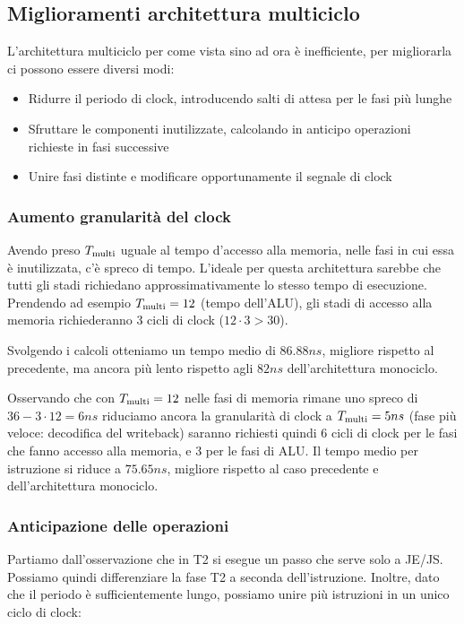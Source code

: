\documentclass[../ace.tex]{subfiles}
\begin{document}
\subsection{Miglioramenti architettura multiciclo}
L'architettura multiciclo per come vista sino ad ora è inefficiente, per migliorarla ci possono essere diversi modi:
\begin{itemize}
    \item Ridurre il periodo di clock, introducendo salti di attesa per le fasi più lunghe
    \item Sfruttare le componenti inutilizzate, calcolando in anticipo operazioni richieste in fasi successive
    \item Unire fasi distinte e modificare opportunamente il segnale di clock
\end{itemize}
\subsubsection{Aumento granularità del clock}
Avendo preso $T_\text{multi}$ uguale al tempo d'accesso alla memoria, nelle fasi in cui essa è inutilizzata, c'è spreco di
tempo. L'ideale per questa architettura sarebbe che tutti gli stadi richiedano approssimativamente lo stesso tempo di
esecuzione.
Prendendo ad esempio $T_\text{multi}=12$ (tempo dell'ALU), gli stadi di accesso alla memoria richiederanno 3 cicli di clock
($12\cdot 3 > 30$).

Svolgendo i calcoli otteniamo un tempo medio di $86.88ns$, migliore rispetto al precedente, ma ancora più lento rispetto
agli $82ns$ dell'architettura monociclo.

Osservando che con $T_\text{multi}=12$ nelle fasi di memoria rimane uno spreco di $36-3\cdot 12=6ns$ riduciamo ancora la
granularità di clock a $T_\text{multi}=5ns$ (fase più veloce: decodifica del writeback)
saranno richiesti quindi 6 cicli di clock per le fasi che fanno accesso alla memoria, e 3 per le fasi di ALU.
Il tempo medio per istruzione si riduce a $75.65ns$, migliore rispetto al caso precedente e dell'architettura monociclo.
\subsubsection{Anticipazione delle operazioni}
Partiamo dall'osservazione che in T2 si esegue un passo che serve solo a JE/JS. Possiamo quindi differenziare la fase T2
a seconda dell'istruzione. Inoltre, dato che il periodo è sufficientemente lungo, possiamo unire più istruzioni in un
unico ciclo di clock:
\end{document}
